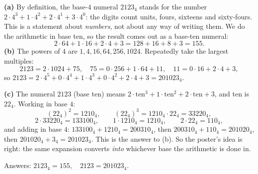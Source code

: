 \textbf{(a)} By definition, the base-$4$ numeral $2123_4$ stands for the number $2\cdot4^3+1\cdot4^2+2\cdot4^1+3\cdot4^0$: the digits count units, fours, sixteens and sixty-fours. This is a statement about \emph{numbers}, not about any way of writing them. We do the arithmetic in base ten, so the result comes out as a base-ten numeral:
\[
2\cdot64+1\cdot16+2\cdot4+3=128+16+8+3=155 .
\]
\textbf{(b)} The powers of $4$ are $1,4,16,64,256,1024$. Repeatedly take the largest multiples:
\[
2123=2\cdot1024+75,\quad 75=0\cdot256+1\cdot64+11,\quad 11=0\cdot16+2\cdot4+3,
\]
so $2123=2\cdot4^5+0\cdot4^4+1\cdot4^3+0\cdot4^2+2\cdot4+3=201023_4$.

\textbf{(c)} The numeral $2123$ (base ten) means $2\cdot\text{ten}^3+1\cdot\text{ten}^2+2\cdot\text{ten}+3$, and ten is $22_4$. Working in base $4$:
\[
(22_4)^2=1210_4,\qquad(22_4)^3=1210_4\cdot22_4=33220_4,
\]
\[
2\cdot33220_4=133100_4,\qquad 1\cdot1210_4=1210_4,\qquad 2\cdot22_4=110_4,
\]
and adding in base $4$: $133100_4+1210_4=200310_4$, then $200310_4+110_4=201020_4$, then $201020_4+3_4=201023_4$. This is the answer to (b). So the poster's idea is right: the same expansion converts \emph{into} whichever base the arithmetic is done in.

Answers: $\boxed{2123_4=155,\quad2123=201023_4}$.
